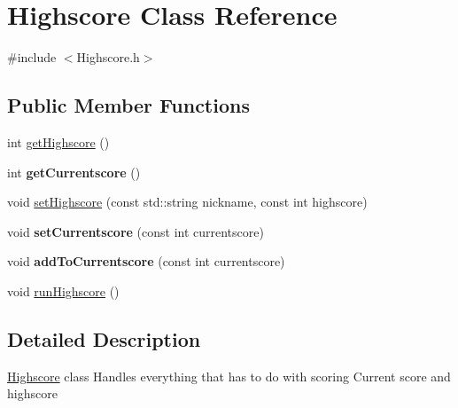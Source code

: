 \hypertarget{class_highscore}{\section{\-Highscore \-Class \-Reference}
\label{class_highscore}
}


{\ttfamily \#include $<$\-Highscore.\-h$>$}

\subsection*{\-Public \-Member \-Functions}
\begin{DoxyCompactItemize}
\item 
int \hyperlink{class_highscore_a8d8beecac257bd959584cb83021fda46}{get\-Highscore} ()
\item 
\hypertarget{class_highscore_a713aa1bd341ce9e816af9556b10a6e0b}{int {\bfseries get\-Currentscore} ()}\label{class_highscore_a713aa1bd341ce9e816af9556b10a6e0b}

\item 
void \hyperlink{class_highscore_a2977c244a903ac6baa01d5c6835266f9}{set\-Highscore} (const std\-::string nickname, const int highscore)
\item 
\hypertarget{class_highscore_a1fc6fdc4639607f6f624a7aa7578764d}{void {\bfseries set\-Currentscore} (const int currentscore)}\label{class_highscore_a1fc6fdc4639607f6f624a7aa7578764d}

\item 
\hypertarget{class_highscore_af95c095f0d3de02e9c2c0b89062c2354}{void {\bfseries add\-To\-Currentscore} (const int currentscore)}\label{class_highscore_af95c095f0d3de02e9c2c0b89062c2354}

\item 
void \hyperlink{class_highscore_a3b47c5a2a79c43177a3ae3783fc1bb3c}{run\-Highscore} ()
\end{DoxyCompactItemize}


\subsection{\-Detailed \-Description}
\hyperlink{class_highscore}{\-Highscore} class \-Handles everything that has to do with scoring \-Current score and highscore 

